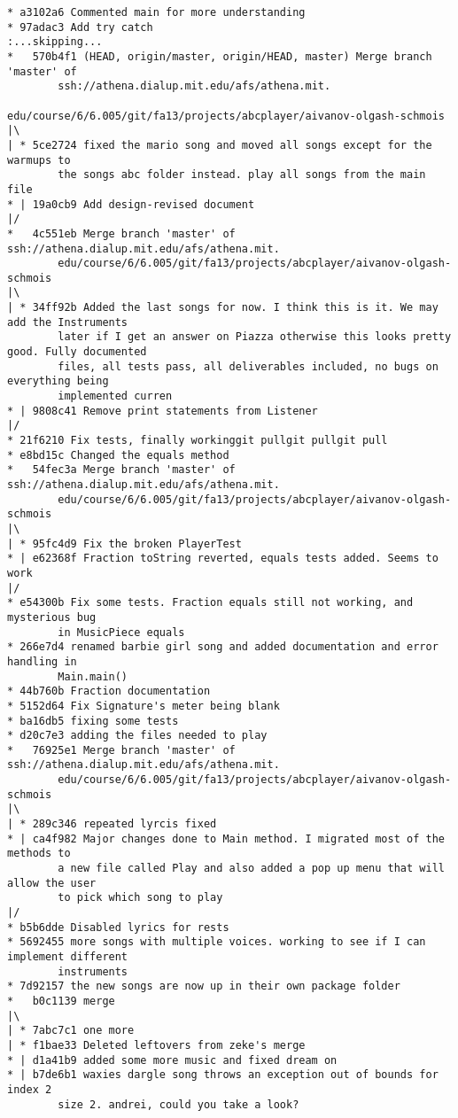\documentclass[12pt]{book}
\begin{document}
\begin{Verbatim}
* a3102a6 Commented main for more understanding
* 97adac3 Add try catch
:...skipping...
*   570b4f1 (HEAD, origin/master, origin/HEAD, master) Merge branch 'master' of 
        ssh://athena.dialup.mit.edu/afs/athena.mit.
                edu/course/6/6.005/git/fa13/projects/abcplayer/aivanov-olgash-schmois
|\
| * 5ce2724 fixed the mario song and moved all songs except for the warmups to 
        the songs abc folder instead. play all songs from the main file
* | 19a0cb9 Add design-revised document
|/
*   4c551eb Merge branch 'master' of ssh://athena.dialup.mit.edu/afs/athena.mit.
        edu/course/6/6.005/git/fa13/projects/abcplayer/aivanov-olgash-schmois
|\
| * 34ff92b Added the last songs for now. I think this is it. We may add the Instruments 
        later if I get an answer on Piazza otherwise this looks pretty good. Fully documented 
        files, all tests pass, all deliverables included, no bugs on everything being 
        implemented curren
* | 9808c41 Remove print statements from Listener
|/
* 21f6210 Fix tests, finally workinggit pullgit pullgit pull
* e8bd15c Changed the equals method
*   54fec3a Merge branch 'master' of ssh://athena.dialup.mit.edu/afs/athena.mit.
        edu/course/6/6.005/git/fa13/projects/abcplayer/aivanov-olgash-schmois
|\
| * 95fc4d9 Fix the broken PlayerTest
* | e62368f Fraction toString reverted, equals tests added. Seems to work
|/
* e54300b Fix some tests. Fraction equals still not working, and mysterious bug 
        in MusicPiece equals
* 266e7d4 renamed barbie girl song and added documentation and error handling in 
        Main.main()
* 44b760b Fraction documentation
* 5152d64 Fix Signature's meter being blank
* ba16db5 fixing some tests
* d20c7e3 adding the files needed to play
*   76925e1 Merge branch 'master' of ssh://athena.dialup.mit.edu/afs/athena.mit.
        edu/course/6/6.005/git/fa13/projects/abcplayer/aivanov-olgash-schmois
|\
| * 289c346 repeated lyrcis fixed
* | ca4f982 Major changes done to Main method. I migrated most of the methods to 
        a new file called Play and also added a pop up menu that will allow the user 
        to pick which song to play
|/
* b5b6dde Disabled lyrics for rests
* 5692455 more songs with multiple voices. working to see if I can implement different 
        instruments
* 7d92157 the new songs are now up in their own package folder
*   b0c1139 merge
|\
| * 7abc7c1 one more
| * f1bae33 Deleted leftovers from zeke's merge
* | d1a41b9 added some more music and fixed dream on
* | b7de6b1 waxies dargle song throws an exception out of bounds for index 2 
        size 2. andrei, could you take a look?

\end{Verbatim}
\end{document}
